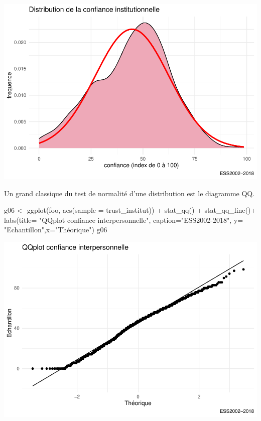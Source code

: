 \documentclass[
]{book}
\newenvironment{Shaded}{\begin{snugshade}}{\end{snugshade}}
\newcommand{\AttributeTok}[1]{\textcolor[rgb]{0.77,0.63,0.00}{#1}}
\newcommand{\FunctionTok}[1]{\textcolor[rgb]{0.00,0.00,0.00}{#1}}
\newcommand{\NormalTok}[1]{#1}
\newcommand{\OtherTok}[1]{\textcolor[rgb]{0.56,0.35,0.01}{#1}}
\newcommand{\SpecialCharTok}[1]{\textcolor[rgb]{0.00,0.00,0.00}{#1}}
\newcommand{\StringTok}[1]{\textcolor[rgb]{0.31,0.60,0.02}{#1}}
\begin{document}
\includegraphics{bookdown-demo_files/figure-latex/305-1.pdf}

Un grand classique du test de normalité d'une distribution est le diagramme QQ.

\begin{Shaded}
\begin{Highlighting}[]
\NormalTok{g06 }\OtherTok{\textless{}{-}} \FunctionTok{ggplot}\NormalTok{(foo, }\FunctionTok{aes}\NormalTok{(}\AttributeTok{sample =}\NormalTok{ trust\_institut)) }\SpecialCharTok{+} 
  \FunctionTok{stat\_qq}\NormalTok{() }\SpecialCharTok{+} \FunctionTok{stat\_qq\_line}\NormalTok{()}\SpecialCharTok{+} 
  \FunctionTok{labs}\NormalTok{(}\AttributeTok{title=} \StringTok{"QQplot confiance interpersonnelle"}\NormalTok{, }
       \AttributeTok{caption=}\StringTok{"ESS2002{-}2018"}\NormalTok{,}
       \AttributeTok{y=} \StringTok{"Echantillon"}\NormalTok{,}\AttributeTok{x=}\StringTok{"Théorique"}\NormalTok{) }
\NormalTok{g06}
\end{Highlighting}
\end{Shaded}

\includegraphics{bookdown-demo_files/figure-latex/306-1.pdf}
\end{document}
